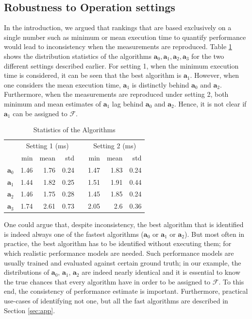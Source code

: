 \documentclass[conference]{IEEEtran}
\begin{document}
\subsection{Robustness to Operation settings}

In the introduction, we argued that rankings that are based exclusively on a single number such as minimum or mean execution time to quantify performance would lead to inconsistency when the measurements are reproduced. Table \ref{tab:2} shows the distribution statistics of the algorithms $\mathbf{a}_0, \mathbf{a}_1, \mathbf{a}_2, \mathbf{a}_3$ for the two different settings described earlier. For setting 1,  when the minimum execution time is considered, it can be seen that the best algorithm is $\mathbf{a}_1$. However, when one considers the mean execution time, $\mathbf{a}_1$ is distinctly behind $\mathbf{a}_0$ and $\mathbf{a}_2$. Furthermore, when the measurements are reproduced under setting 2,  both minimum and mean estimates of $\mathbf{a}_1$ lag behind $\mathbf{a}_0$ and $\mathbf{a}_2$. Hence, it is not clear if $\mathbf{a}_1$ can be assigned to $\mathcal{F}$.
\begin{table}[h!]
	\begin{center}
		\renewcommand{\arraystretch}{1.2}
		\begin{tabular}{@{}r rrr c rrr@{}}
			\toprule
			& \multicolumn{3}{c}{Setting 1 (ms)} & & \multicolumn{3}{c}{Setting 2 (ms)} \\
			\cmidrule{2-4} \cmidrule{6-8}
			& min & mean & std && min & mean & std \\
			\midrule
			{$\mathbf{a}_0$ \hfill }& 1.46  & 1.76  & 0.24  && 1.47  & 1.83  & 0.24  \\
			{$\mathbf{a}_1$ } & 1.44  & 1.82   & 0.25  && 1.51  & 1.91   & 0.44  \\
			{$\mathbf{a}_2$ } & 1.46  & 1.75  & 0.28  && 1.45  & 1.85  & 0.24  \\
			{$\mathbf{a}_3$ } & 1.74  & 2.61  & 0.73  && 2.05  & 2.6  & 0.36  \\
			\bottomrule
		\end{tabular}
		\caption{Statistics of the Algorithms}
		\label{tab:2}
	\end{center}
\end{table}

One could argue that, despite inconsistency, the best algorithm that is identified is indeed always one of the fastest algorithms ($\mathbf{a}_0$ or $\mathbf{a}_1$ or $\mathbf{a}_2$). But most often in practice, the best algorithm has to be identified without executing them; for which realistic performance models are needed. Such performance models are usually trained and evaluated against certain ground truth; in our example, the distributions of $\mathbf{a}_0$, $\mathbf{a}_1$, $\mathbf{a}_2$ are indeed nearly identical and it is essential to know the true chances that every algorithm have in order to be assigned to $\mathcal{F}$. To this end, the consistency of performance estimate is important. Furthermore, practical use-cases of identifying not one, but all the fast algorithms are described in Section \ref{sec:app}. 
 
\end{document}
